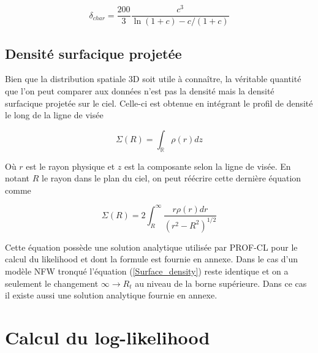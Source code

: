 \documentclass[a4paper,11pt]{article}
\numberwithin{equation}{section}
\begin{document}
    \begin{equation}
      \delta_{char} = \frac{200}{3} \frac{c^3}{\ln(1+c) - c / (1+c)}
    \end{equation}
    
  \subsection{Densité surfacique projetée}
    Bien que la distribution spatiale 3D soit utile à connaître, la véritable quantité que l'on peut comparer aux données n'est pas la densité mais la densité surfacique projetée sur le ciel. Celle-ci est obtenue en intégrant le profil de densité le long de la ligne de visée
    
    \begin{equation}
      \Sigma (R) = \int_{\mathbb{R}} \rho (r) dz        %
    \end{equation}
    
    Où $r$ est le rayon physique et $z$ est la composante selon la ligne de visée. En notant $R$ le rayon dans le plan du ciel, on peut réécrire cette dernière équation comme
    
    \begin{equation}
      \label{eq:Surface_density}
      \Sigma(R) = 2 \int _{R}^{\infty} \frac{r \rho (r) dr}{(r^2 - R^2)^{1/2}} 
    \end{equation}
    
    Cette équation possède une solution analytique utilisée par PROF-CL pour le calcul du likelihood et dont la formule est fournie en annexe. Dans le cas d'un modèle NFW tronqué l'équation (\ref{Surface_density}) reste identique et on a seulement le changement $\infty \rightarrow R_t$ au niveau de la borne supérieure. Dans ce cas il existe aussi une solution analytique fournie en annexe.

  \newpage
  \section{Calcul du log-likelihood}
\end{document}
